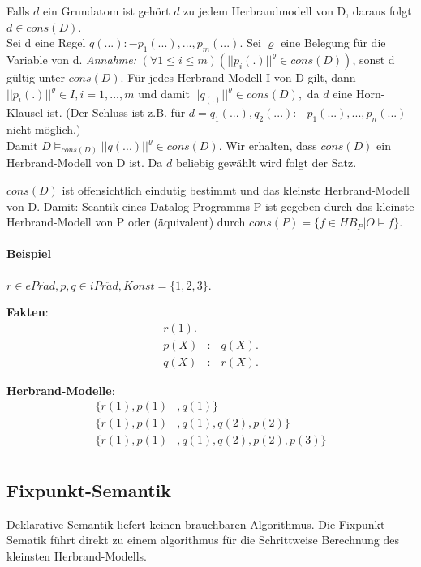 \documentclass[12pt, a4paper]{article}
\begin{document}
Falls $d$ ein Grundatom ist gehört $d$ zu jedem Herbrandmodell von D, daraus folgt $d \in cons(D)$. \\
Sei d eine Regel $q(...) :- p_1(...),...,p_m(...)$. Sei $\varrho$ eine Belegung für die Variable von d. \textit{Annahme:} $(\forall 1 \le i \le m)(|| p_i(.)||^{\varrho} \in cons(D))$, sonst d gültig unter $cons(D)$.
Für jedes Herbrand-Modell I von D gilt, dann $||p_i(.)||^{\varrho} \in I, i = 1, ..., m$ und damit $||q_(.)||^{\varrho} \in cons(D),$ da $d$ eine Horn-Klausel ist.
(Der Schluss ist z.B. für $d = q_1(...), q_2(...) :- p_1(...), ..., p_n(...)$ nicht möglich.) \\

Damit $D \vDash_{cons(D)} ||q(...)||^{\varrho} \in cons(D)$. Wir erhalten, dass $cons(D)$ ein Herbrand-Modell von D ist. Da $d$ beliebig gewählt wird folgt der Satz.

$cons(D)$ ist offensichtlich eindutig bestimmt und das kleinste Herbrand-Modell von D. Damit: Seantik eines Datalog-Programms P ist gegeben durch das kleinste Herbrand-Modell von P oder (äquivalent) durch $cons(P) = \{ f\in HB_{P} | O \vDash f \}$.

\paragraph*{Beispiel}
$r \in ePr\ddot{a}d, p,q \in iPr\ddot{a}d, Konst = \{ 1, 2, 3 \}$.

\textbf{Fakten}: \\
\begin{equation}
\begin{split}
r(1).& \\
p(X) &:- q(X). \\
q(X) &:- r(X).
\end{split}
\end{equation}

\textbf{Herbrand-Modelle}: \\
\begin{equation}
\begin{split}
\{ r(1), p(1)&, q(1) \} \\
\{ r(1), p(1)&, q(1), q(2), p(2) \} \\
\{ r(1), p(1)&, q(1), q(2), p(2), p(3) \} \\
\end{split}
\end{equation}

\subsection*{Fixpunkt-Semantik}
Deklarative Semantik liefert keinen brauchbaren Algorithmus. Die Fixpunkt-Sematik führt direkt zu einem algorithmus für die Schrittweise Berechnung des kleinsten Herbrand-Modells.
\end{document}
